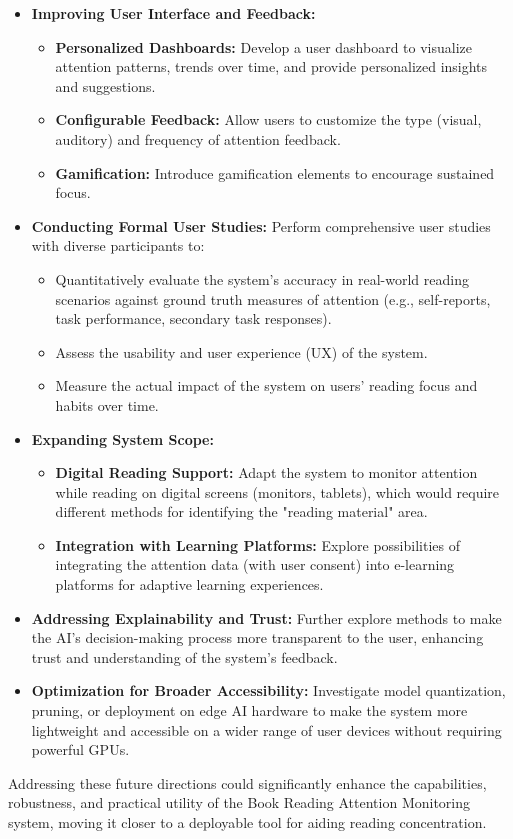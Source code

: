 \begin{itemize}
    \item \textbf{Improving User Interface and Feedback:}
    \begin{itemize}
        \item \textbf{Personalized Dashboards:} Develop a user dashboard to visualize attention patterns, trends over time, and provide personalized insights and suggestions.
        \item \textbf{Configurable Feedback:} Allow users to customize the type (visual, auditory) and frequency of attention feedback.
        \item \textbf{Gamification:} Introduce gamification elements to encourage sustained focus.
    \end{itemize}

    \item \textbf{Conducting Formal User Studies:}
    Perform comprehensive user studies with diverse participants to:
    \begin{itemize}
        \item Quantitatively evaluate the system's accuracy in real-world reading scenarios against ground truth measures of attention (e.g., self-reports, task performance, secondary task responses).
        \item Assess the usability and user experience (UX) of the system.
        \item Measure the actual impact of the system on users' reading focus and habits over time.
    \end{itemize}

    \item \textbf{Expanding System Scope:}
    \begin{itemize}
        \item \textbf{Digital Reading Support:} Adapt the system to monitor attention while reading on digital screens (monitors, tablets), which would require different methods for identifying the "reading material" area.
        \item \textbf{Integration with Learning Platforms:} Explore possibilities of integrating the attention data (with user consent) into e-learning platforms for adaptive learning experiences.
    \end{itemize}

    \item \textbf{Addressing Explainability and Trust:}
    Further explore methods to make the AI's decision-making process more transparent to the user, enhancing trust and understanding of the system's feedback.

    \item \textbf{Optimization for Broader Accessibility:}
    Investigate model quantization, pruning, or deployment on edge AI hardware to make the system more lightweight and accessible on a wider range of user devices without requiring powerful GPUs.
\end{itemize}
Addressing these future directions could significantly enhance the capabilities, robustness, and practical utility of the Book Reading Attention Monitoring system, moving it closer to a deployable tool for aiding reading concentration.